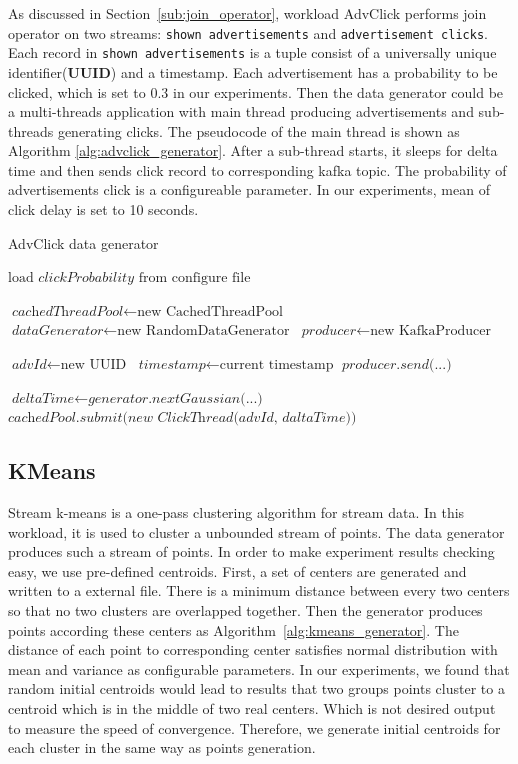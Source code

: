 As discussed in Section~\ref{sub:join_operator}, workload AdvClick performs join operator on two streams: \texttt{shown advertisements} and \texttt{advertisement clicks}. Each record in  \texttt{shown advertisements} is a tuple consist of a universally unique identifier(\textbf{UUID}) and a timestamp. Each advertisement has a probability to be clicked, which is set to 0.3 in our experiments. Then the data generator could be a multi-threads application with main thread producing advertisements and sub-threads generating clicks. The pseudocode of the main thread is shown as Algorithm \ref{alg:advclick_generator}. After a sub-thread starts, it sleeps for delta time and then sends click record to corresponding kafka topic. The probability of advertisements click is a configureable parameter. In our experiments, mean of click delay is set to 10 seconds. 

\begin{algorithm}
\caption{AdvClick data generator}
\label{alg:advclick_generator}
\begin{algorithmic}[1]
\State $\text{load } \textit{clickProbability} \text{ from configure file}$

\State $\textit{cachedThreadPool} \gets \text{new CachedThreadPool}$
\State $\textit{dataGenerator} \gets \text{new RandomDataGenerator}$ 
\State $\textit{producer} \gets \text{new KafkaProducer}$ 

\State $\textit{advId} \gets \text{new UUID}$ 
\State $\textit{timestamp} \gets \text{current timestamp}$ 
\State $\textit{producer.send(...)}$ 

\State $\textit{deltaTime} \gets \textit{generator.nextGaussian(...)}$ 
\State $\textit{cachedPool.submit(new ClickThread(advId, daltaTime))} $ 
\EndIf
\EndWhile
\end{algorithmic}
\end{algorithm}

\subsection{KMeans}

Stream k-means is a one-pass clustering algorithm for stream data. In this workload, it is used to cluster a unbounded stream of points. The data generator produces such a stream of points. In order to make experiment results checking easy, we use pre-defined centroids. First, a set of centers are generated and written to a external file. There is a minimum distance between every two centers so that no two clusters are overlapped together. Then the generator produces points according these centers as Algorithm~\ref{alg:kmeans_generator}. The distance of each point to corresponding center satisfies normal distribution with mean and variance as configurable parameters. In our experiments, we found that random initial centroids would lead to results that two groups points cluster to a centroid which is in the middle of two real centers. Which is not desired output to measure the speed of convergence. Therefore, we generate initial centroids for each cluster in the same way as points generation.  

